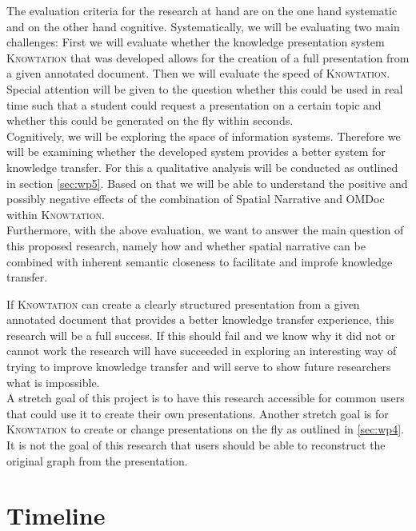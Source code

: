 \documentclass[twoside]{article}
\newcommand{\sys}{\textsc{Knowtation}\xspace}
\begin{document}
The evaluation criteria for the research at hand are on the one hand systematic and on the other hand cognitive. Systematically, we will be evaluating two main challenges: First we will evaluate whether the knowledge presentation system \sys that was developed allows for the creation of a full presentation from a given annotated document. Then we will evaluate the speed of \sys. Special attention will be given to the question whether this could be used in real time such that a student could request a presentation on a certain topic and whether this could be generated on the fly within seconds.\\

Cognitively, we will be exploring the space of information systems. Therefore we will be examining whether the developed system provides a better system for knowledge transfer. For this a qualitative analysis will be conducted as outlined in section \ref{sec:wp5}. Based on that we will be able to understand the positive and possibly negative effects of the combination of Spatial Narrative and OMDoc within \sys .\\

Furthermore, with the above evaluation, we want to answer the main question of this proposed research, namely how and whether spatial narrative can be combined with inherent semantic closeness to facilitate and improfe knowledge transfer.

If \sys can create a clearly structured presentation from a given annotated document that provides a better knowledge transfer experience, this research will be a full success. If this should fail and we know why it did not or cannot work the research will have succeeded in exploring an interesting way of trying to improve knowledge transfer and will serve to show future researchers what is impossible.\\

A stretch goal of this project is to have this research accessible for common users that could use it to create their own presentations. Another stretch goal is for \sys to create or change presentations on the fly as outlined in \ref{sec:wp4}. It is not the goal of this research that users should be able to reconstruct the original graph from the presentation.\\

\section{Timeline}
\label{sec:timeline}
\end{document}
